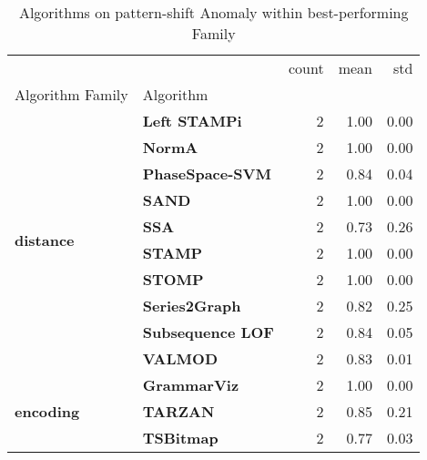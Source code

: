 \begin{table}
\caption{Algorithms on pattern-shift Anomaly within best-performing Family}
\label{tab:bp-pattern-shift}
\begin{tabular}{llrrr}
\toprule
 &  & count & mean & std \\
Algorithm Family & Algorithm &  &  &  \\
\midrule
\multirow[t]{10}{*}{\textbf{distance}} & \textbf{Left STAMPi} & 2 & 1.00 & 0.00 \\
\textbf{} & \textbf{NormA} & 2 & 1.00 & 0.00 \\
\textbf{} & \textbf{PhaseSpace-SVM} & 2 & 0.84 & 0.04 \\
\textbf{} & \textbf{SAND} & 2 & 1.00 & 0.00 \\
\textbf{} & \textbf{SSA} & 2 & 0.73 & 0.26 \\
\textbf{} & \textbf{STAMP} & 2 & 1.00 & 0.00 \\
\textbf{} & \textbf{STOMP} & 2 & 1.00 & 0.00 \\
\textbf{} & \textbf{Series2Graph} & 2 & 0.82 & 0.25 \\
\textbf{} & \textbf{Subsequence LOF} & 2 & 0.84 & 0.05 \\
\textbf{} & \textbf{VALMOD} & 2 & 0.83 & 0.01 \\
\cline{1-5}
\multirow[t]{3}{*}{\textbf{encoding}} & \textbf{GrammarViz} & 2 & 1.00 & 0.00 \\
\textbf{} & \textbf{TARZAN} & 2 & 0.85 & 0.21 \\
\textbf{} & \textbf{TSBitmap} & 2 & 0.77 & 0.03 \\
\cline{1-5}
\bottomrule
\end{tabular}
\end{table}

